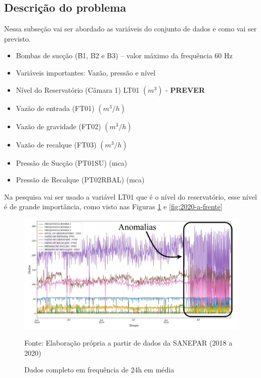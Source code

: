 \subsection{Descrição do problema} \label{subsec:descricao}

Nessa subseção vai ser abordado as variáveis do conjunto de dados e como vai ser previsto.

\begin{itemize}
\item Bombas de sucção (B1, B2 e B3) – valor máximo da frequência 60 Hz

\item[] Variáveis importantes: Vazão, pressão e nível

\item Nível do Reservatório (Câmara 1) LT01 $ (m^3) $ - \textbf{PREVER}

\item Vazão de entrada (FT01) $ (m^3/h) $

\item Vazão de gravidade (FT02) $ (m^3/h) $

\item Vazão de recalque (FT03) $ (m^3/h) $

\item Pressão de Sucção (PT01SU) (mca)

\item Pressão de Recalque (PT02RBAL) (mca)
\end{itemize}


Na pesquisa vai ser usado a variável LT01 que é o nível do reservatório, esse nível é de grande importância, como visto nas Figuras \ref{fig:dados-todos} e \ref{fig:2020-a-frente} 

\begin{figure}[H]
	\centering
	\caption{Dados completo em frequência de 24h em média}
	\label{fig:dados-todos}
	\includegraphics[width=1\linewidth]{"Introducao/Figuras/dados todos"}
	
	Fonte: Elaboração própria a partir de dados da SANEPAR (2018 a 2020)
\end{figure}

